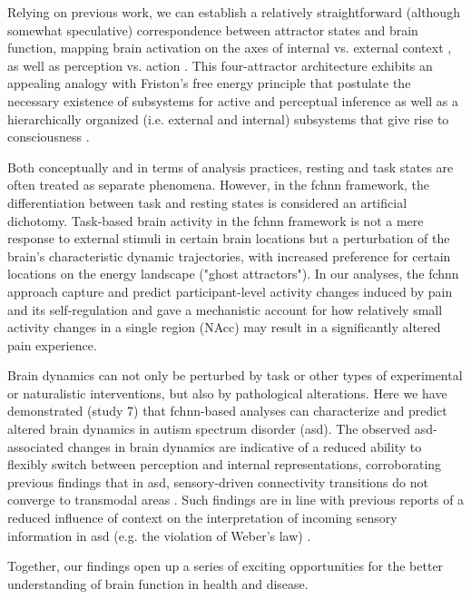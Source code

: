\documentclass{article}
\begin{document}
Relying on previous work, we can establish a relatively straightforward (although somewhat speculative) correspondence between attractor states and brain function, mapping brain activation on the axes of internal vs. external context \citep{golland2008data, cioli2014differences}, as well as perception vs. action \citep{fuster2004upper}.
This four-attractor architecture exhibits an appealing analogy with Friston's free energy principle \citep{friston2006free} that postulate the necessary existence of subsystems for active and perceptual inference as well as a hierarchically organized (i.e. external and internal) subsystems that give rise to consciousness \citep{ramstead2023inner, lee2023life}.

Both conceptually and in terms of analysis practices, resting and task states are often treated as separate phenomena. However, in the \acrshort{fchnn} framework, the differentiation between task and resting states is considered an artificial dichotomy.
Task-based brain activity in the \acrshort{fchnn} framework is not a mere response to external stimuli in certain brain locations but a perturbation of the brain's characteristic dynamic trajectories, with increased preference for certain locations on the energy landscape ("ghost attractors").
In our analyses, the \acrshort{fchnn} approach capture and predict participant-level activity changes induced by pain and its self-regulation and gave a mechanistic account for how relatively small activity changes in a single region (NAcc) may result in a significantly altered pain experience.

Brain dynamics can not only be perturbed by task or other types of experimental or naturalistic interventions, but also by pathological alterations. Here we have demonstrated (study 7) that \acrshort{fchnn}-based analyses can characterize and predict altered brain dynamics in autism spectrum disorder (\acrshort{asd}). The observed \acrshort{asd}-associated changes in brain dynamics are indicative of a reduced ability to flexibly switch between perception and internal representations, corroborating previous findings that in \acrshort{asd}, sensory-driven connectivity transitions do not converge to transmodal areas \citep{hong2019atypical}. Such findings are in line with previous reports of a reduced influence of context on the interpretation of incoming sensory information in \acrshort{asd} (e.g. the violation of Weber's law) \citep{hadad2019perception}.

Together, our findings open up a series of exciting opportunities for the better understanding of brain function in health and disease.
\end{document}
